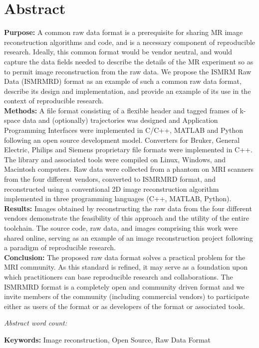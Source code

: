 \documentclass[12pt]{article}
\begin{document}
\section*{Abstract}
\textbf{Purpose:} A common raw data format is a prerequisite for sharing MR image reconstruction algorithms and code, and is a necessary component of reproducible research.  Ideally, this common format would be vendor neutral, and would capture the data fields needed to describe the details of the MR experiment so as to permit image reconstruction from the raw data.  We propose the ISMRM Raw Data (ISMRMRD) format as an example of such a common raw data format, describe its design and implementation, and provide an example of its use in the context of reproducible research.\\
\textbf{Methods:} A file format consisting of a flexible header and tagged frames of k-space data and (optionally) trajectories was designed and  Application Programming Interfaces were implemented in C/C++, MATLAB and Python following an open source development model.  Converters for Bruker, General Electric, Philips and Siemens proprietary file formats were implemented in C++. The library and associated tools were compiled on Linux, Windows, and Macintosh computers. Raw data were collected from a phantom on MRI scanners from the four different vendors, converted to ISMRMRD format, and reconstructed using a conventional 2D image reconstruction algorithm implemented in three programming languages (C++, MATLAB, Python).\\
\textbf{Results:} Images obtained by reconstructing the raw data from the four different vendors demonstrate the feasibility of this approach and the utility of the entire toolchain.  The source code, raw data, and images comprising this work were shared online, serving as an example of an image reconstruction project following a paradigm of reproducible research.\\
\textbf{Conclusion:} The proposed raw data format solves a practical problem
for the MRI community.  As this standard is refined, it may serve as a foundation upon which practitioners can base reproducible research and collaborations.  The ISMRMRD format is a completely open and community driven format and we invite members of the community (including commercial vendors) to participate either as users of the format or as developers of the format or associated tools.

\textit{Abstract word count: }  

\textbf{Keywords:}  Image reconstruction, Open Source, Raw Data Format
\end{document}
